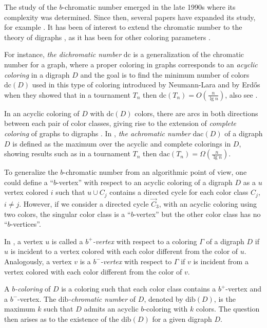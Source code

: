 \documentclass[12pt]{article}
\begin{document}
The study of the $b$-chromatic number emerged in the late 1990s \cite{MR1670155} where its complexity was determined. Since then, several papers have expanded its study, for example \cite{MR2606622,MR1927071,MR2063820}. It has been of interest to extend the chromatic number to the theory of digraphs \cite{javiernol2024dibchromaticnumberdigraphs,MR3511873}, as it has been for other coloring parameters \cite{MR3875016,MR4426060,MR2998438,MR693366,MR3202296}. 

For instance, \emph{the dichromatic number} $\text{dc}$ is a generalization of the chromatic number for a graph, where a proper coloring in graphs corresponds to an \emph{acyclic coloring} in a digraph $D$ and the goal is to find the minimum number of colors $\text{dc}(D)$ used in this type of coloring introduced by Neumann-Lara \cite{MR693366} and by Erd{\H o}s \cite{MR593699} when they showed that in a tournament $T_n$ then $\text{dc}(T_n)=O(\frac{n}{\lg n})$, also see \cite{MR841316}.

In an acyclic coloring of $D$ with $\text{dc}(D)$ colors, there are arcs in both directions between each pair of color classes, giving rise to the extension of \emph{complete coloring} of graphs to digraphs \cite{MR2895432,MR3329642}. In \cite{MR3875016}, \emph{the achromatic number} $\text{dac}(D)$ of a digraph $D$ is defined as the maximum over the acyclic and complete colorings in $D$, showing results such as in a tournament $T_n$ then $\text{dac}(T_n)=\Omega(\frac{n}{\lg n})$.

To generalize the $b$-chromatic number from an algorithmic point of view, one could define a ``$b$-vertex'' with respect to an acyclic coloring of a digraph $D$ as a $u$ vertex colored $i$ such that $u\cup C_j$ contains a directed cycle for each color class $C_j$, $i\not=j$. However, if we consider a directed cycle $\overrightarrow{C}_3$, with an acyclic coloring using two colors, the singular color class is a ``$b$-vertex'' but the other color class has no ``$b$-vertices''.

In \cite{javiernol2024dibchromaticnumberdigraphs}, a vertex $u$ is called a \emph{$b^+$-vertex} with respect to a coloring $\Gamma$ of a digraph $D$ if $u$ is incident to a vertex colored with each color different from the color of $u$. Analogously, a vertex $v$ is a \emph{$b^-$-vertex} with respect to $\Gamma$ if $v$ is incident from a vertex colored with each color different from the color of $v$.

A \emph{$b$-coloring} of $D$ is a coloring such that each color class contains a $b^+$-vertex and a $b^-$-vertex.
The \emph{$\text{dib}$-chromatic number} of $D$, denoted by $\text{dib}(D)$, is the maximum $k$ such that $D$ admits an acyclic $b$-coloring with $k$ colors. The question then arises as to the existence of the $\text{dib}(D)$ for a given digraph $D$.
\end{document}
